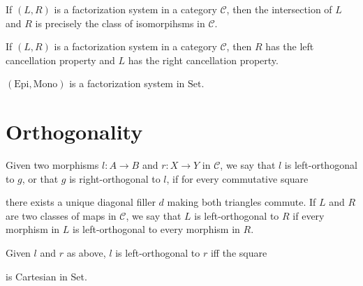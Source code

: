 \begin{lemma}
  \leanok
  If $(L,R)$ is a factorization system in a category $\mathcal{C}$, then the intersection of $L$ and $R$ is precisely the class of isomorpihsms in $\mathcal{C}$.
\end{lemma}

\begin{lemma}
  \leanok
  If $(L,R)$ is a factorization system in a category $\mathcal{C}$, then $R$ has the left cancellation property and $L$ has the right cancellation property.
\end{lemma}

\begin{lemma}
  \leanok
  $(\text{Epi},\text{Mono})$ is a factorization system in $\text{Set}$.
\end{lemma}

\section{Orthogonality}

\begin{definition}
  \leanok
  Given two morphisms $l : A \to B$ and $r : X \to Y$ in $\mathcal{C}$, we say that $l$ is left-orthogonal to $g$, or that $g$ is right-orthogonal to $l$, if for every commutative square
  \begin{center}
  \end{center}
  there exists a unique diagonal filler $d$ making both triangles commute. If $L$ and $R$ are two classes of maps in $\mathcal{C}$, we say that $L$ is left-orthogonal to $R$ if every morphism in $L$ is left-orthogonal to every morphism in $R$.
\end{definition}

\begin{lemma}
  \leanok
  Given $l$ and $r$ as above, $l$ is left-orthogonal to $r$ iff the square
  \begin{center}
  \end{center}
  is Cartesian in Set. 
\end{lemma}

